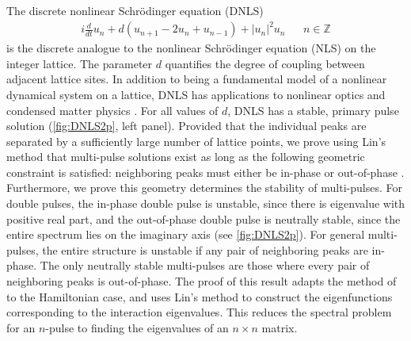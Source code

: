 \documentclass[12pt,reqno,oneside,hidelinks]{article}
\begin{document}
The discrete nonlinear Schr{\"o}dinger equation (DNLS) 
\begin{align*}
    i \frac{d}{dt} u_n + d(u_{n+1} - 2 u_n + u_{n-1}) + |u_n|^2 u_n && n \in \mathbb{Z}
\end{align*}
is the discrete analogue to the nonlinear Schr{\"o}dinger equation (NLS) on the integer lattice. The parameter $d$ quantifies the degree of coupling between adjacent lattice sites. In addition to being a fundamental model of a nonlinear dynamical system on a lattice, DNLS has applications to nonlinear optics and condensed matter physics \cite{Kevrekidis2009}. For all values of $d$, DNLS has a stable, primary pulse solution (\cref{fig:DNLS2p}, left panel). Provided that the individual peaks are separated by a sufficiently large number of lattice points, we prove using Lin's method that multi-pulse solutions exist as long as the following geometric constraint is satisfied: neighboring peaks must either be in-phase or out-of-phase \cite{Parker2020}. Furthermore, we prove this geometry determines the stability of multi-pulses. For double pulses, the in-phase double pulse is unstable, since there is eigenvalue with positive real part, and the out-of-phase double pulse is neutrally stable, since the entire spectrum lies on the imaginary axis (see \cref{fig:DNLS2p}). For general multi-pulses, the entire structure is unstable if any pair of neighboring peaks are in-phase. The only neutrally stable multi-pulses are those where every pair of neighboring peaks is out-of-phase. The proof of this result adapts the method of \cite{Sandstede1998} to the Hamiltonian case, and uses Lin's method to construct the eigenfunctions corresponding to the interaction eigenvalues. This reduces the spectral problem for an $n$-pulse to finding the eigenvalues of an $n\times n$ matrix.
\end{document}
